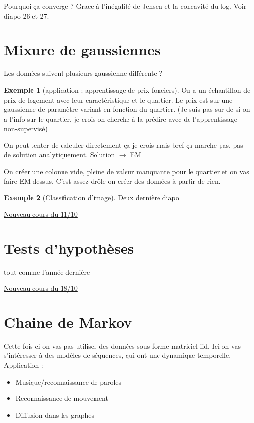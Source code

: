 \documentclass{article}
\theoremstyle{plain}%
\theoremstyle{definition}
\newtheorem{exmp}{Exemple}[section]
\theoremstyle{remark}
\begin{document}
Pourquoi ça converge ? Grace à l'inégalité de Jensen et la concavité du log. Voir diapo 26 et 27. 

\section{Mixure de gaussiennes}
Les données suivent plusieurs gaussienne différente ? 

\begin{exmp}[application : apprentissage de prix fonciers]
    On a un échantillon de prix de logement avec leur caractéristique et le quartier. Le prix est sur une gaussienne de paramètre variant en fonction du quartier. (Je suis pas sur de si on a l'info sur le quartier, je crois on cherche à la prédire avec de l'apprentissage non-supervisé)

    On peut tenter de calculer directement ça je crois mais bref ça marche pas, pas de solution analytiquement. Solution $\rightarrow$ EM 

    On créer une colonne vide, pleine de valeur manquante pour le quartier et on vas faire EM dessus. C'est assez drôle on créer des données à partir de rien. 
\end{exmp}

\begin{exmp}[Classification d'image]
    Deux dernière diapo
\end{exmp}


\underline{Nouveau cours du 11/10} \\

\section{Tests d'hypothèses}

tout comme l'année dernière 

\underline{Nouveau cours du 18/10} \\

\section{Chaine de Markov}
Cette fois-ci on vas pas utiliser des données sous forme matriciel iid. Ici on vas s'intéresser à des modèles de séquences, qui ont une dynamique temporelle. Application :
\begin{itemize}
    \item Musique/reconnaissance de paroles
    \item Reconnaissance de mouvement 
    \item Diffusion dans les graphes
\end{itemize}
\end{document}
